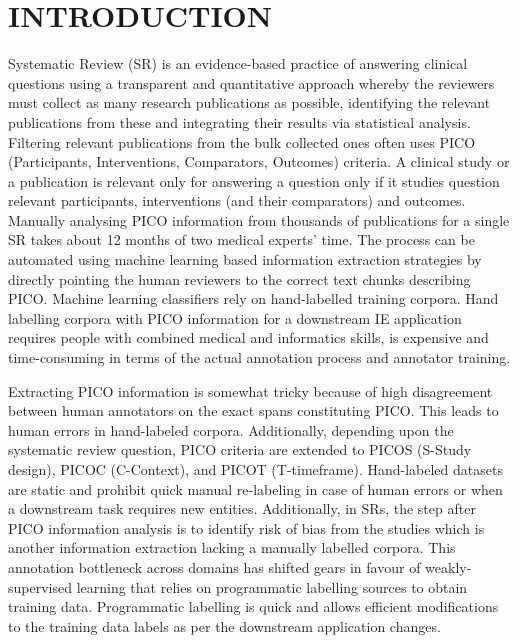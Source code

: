 \documentclass[10.7pt,]{article}
\begin{document}
\section{INTRODUCTION}\label{introduction}
%
Systematic Review (SR) is an evidence-based practice of answering clinical questions using a transparent and quantitative approach whereby the reviewers must collect as many research publications as possible, identifying the relevant publications from these and integrating their results via statistical analysis.
Filtering relevant publications from the bulk collected ones often uses PICO (Participants, Interventions, Comparators, Outcomes) criteria. 
A clinical study or a publication is relevant only for answering a question only if it studies question relevant participants, interventions (and their comparators) and outcomes. 
Manually analysing PICO information from thousands of publications for a single SR takes about 12 months of two medical experts' time.
The process can be automated using machine learning based information extraction strategies by directly pointing the human reviewers to the correct text chunks describing PICO.
Machine learning classifiers rely on hand-labelled training corpora.
Hand labelling corpora with PICO information for a downstream IE application requires people with combined medical and informatics skills, is expensive and time-consuming in terms of the actual annotation process and annotator training.


Extracting PICO information is somewhat tricky because of high disagreement between human annotators on the exact spans constituting PICO.
This leads to human errors in hand-labeled corpora.
Additionally, depending upon the systematic review question, PICO criteria are extended to PICOS (S-Study design), PICOC (C-Context), and PICOT (T-timeframe).
Hand-labeled datasets are static and prohibit quick manual re-labeling in case of human errors or when a downstream task requires new entities.
Additionally, in SRs, the step after PICO information analysis is to identify risk of bias from the studies which is another information extraction lacking a manually labelled corpora. 
This annotation bottleneck across domains has shifted gears in favour of weakly-supervised learning that relies on programmatic labelling sources to obtain training data.
Programmatic labelling is quick and allows efficient modifications to the training data labels as per the downstream application changes.
\end{document}
